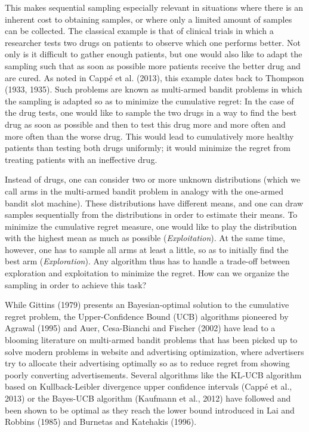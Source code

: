 \documentclass[11pt,]{article}
\begin{document}
This makes sequential sampling especially relevant in situations where
there is an inherent cost to obtaining samples, or where only a limited
amount of samples can be collected. The classical example is that of
clinical trials in which a researcher tests two drugs on patients to
observe which one performs better. Not only is it difficult to gather
enough patients, but one would also like to adapt the sampling such that
as soon as possible more patients receive the better drug and are cured.
As noted in Cappé et al. (2013), this example dates back to Thompson
(1933, 1935). Such problems are known as multi-armed bandit problems in
which the sampling is adapted so as to minimize the cumulative regret:
In the case of the drug tests, one would like to sample the two drugs in
a way to find the best drug as soon as possible and then to test this
drug more and more often and more often than the worse drug. This would
lead to cumulatively more healthy patients than testing both drugs
uniformly; it would minimize the regret from treating patients with an
ineffective drug.

Instead of drugs, one can consider two or more unknown distributions
(which we call arms in the multi-armed bandit problem in analogy with
the one-armed bandit slot machine). These distributions have different
means, and one can draw samples sequentially from the distributions in
order to estimate their means. To minimize the cumulative regret
measure, one would like to play the distribution with the highest mean
as much as possible (\emph{Exploitation}). At the same time, however,
one has to sample all arms at least a little, so as to initially find
the best arm (\emph{Exploration}). Any algorithm thus has to handle a
trade-off between exploration and exploitation to minimize the regret.
How can we organize the sampling in order to achieve this task?

While Gittins (1979) presents an Bayesian-optimal solution to the
cumulative regret problem, the Upper-Confidence Bound (UCB) algorithms
pioneered by Agrawal (1995) and Auer, Cesa-Bianchi and Fischer (2002)
have lead to a blooming literature on multi-armed bandit problems that
has been picked up to solve modern problems in website and advertising
optimization, where advertisers try to allocate their advertising
optimally so as to reduce regret from showing poorly converting
advertisements. Several algorithms like the KL-UCB algorithm based on
Kullback-Leibler divergence upper confidence intervals (Cappé et al.,
2013) or the Bayes-UCB algorithm (Kaufmann et al., 2012) have followed
and been shown to be optimal as they reach the lower bound introduced in
Lai and Robbins (1985) and Burnetas and Katehakis (1996).
\end{document}
